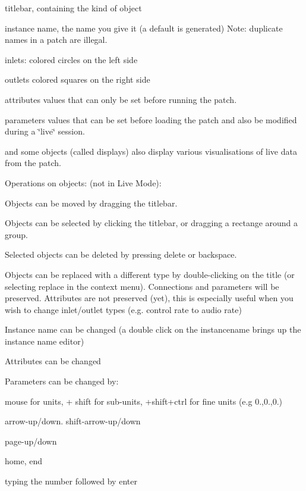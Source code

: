 \begin{DoxyItemize}
\item titlebar, containing the kind of object 
\item instance name, the name you give it (a default is generated) Note\+: duplicate names in a patch are illegal. 
\item inlets\+: colored circles on the left side 
\item outlets colored squares on the right side 
\item attributes values that can only be set before running the patch. 
\item parameters values that can be set before loading the patch and also be modified during a \char`\"{}live\char`\"{} session.  
\end{DoxyItemize}

and some objects (called displays) also display various visualisations of live data from the patch.

Operations on objects\+: (not in Live Mode)\+:


\begin{DoxyItemize}
\item Objects can be moved by dragging the titlebar. 
\item Objects can be selected by clicking the titlebar, or dragging a rectange around a group. 
\item Selected objects can be deleted by pressing delete or backspace. 
\item Objects can be replaced with a different type by double-\/clicking on the title (or selecting replace in the context menu). Connections and parameters will be preserved. Attributes are not preserved (yet), this is especially useful when you wish to change inlet/outlet types (e.\+g. control rate to audio rate) 
\item Instance name can be changed (a double click on the instancename brings up the instance name editor) 
\item Attributes can be changed 
\item Parameters can be changed by\+: 
\begin{DoxyItemize}
\item mouse for units, + shift for sub-\/units, +shift+ctrl for fine units (e.\+g 0.,0.,0.) 
\item arrow-\/up/down. shift-\/arrow-\/up/down 
\item page-\/up/down 
\item home, end 
\item typing the number followed by enter 
\end{DoxyItemize}
\end{DoxyItemize}

